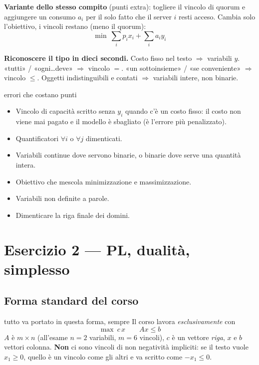 \documentclass[11pt,a4paper]{article}
\begin{document}
\textbf{Variante dello stesso compito} (punti extra): togliere il vincolo di quorum e
aggiungere un consumo $a_i$ per il solo fatto che il server $i$ resti acceso. Cambia solo
l'obiettivo, i vincoli restano (meno il quorum):
\[
\min \ \sum_i p_i x_i + \sum_i a_i y_i
\]

\begin{idea}
\textbf{Riconoscere il tipo in dieci secondi.}
Costo fisso nel testo $\Rightarrow$ variabili $y$. \enspace
«tutti» / «ogni\dots deve» $\Rightarrow$ vincolo $=$. \enspace
«un sottoinsieme» / «se conveniente» $\Rightarrow$ vincolo $\le$. \enspace
Oggetti indistinguibili e contati $\Rightarrow$ variabili intere, non binarie.
\end{idea}

\begin{att}{errori che costano punti}
\begin{itemize}
\item Vincolo di capacità scritto senza $y_i$ quando c'è un costo fisso: il costo non viene mai
      pagato e il modello è sbagliato (è l'errore più penalizzato).
\item Quantificatori $\forall i$ o $\forall j$ dimenticati.
\item Variabili continue dove servono binarie, o binarie dove serve una quantità intera.
\item Obiettivo che mescola minimizzazione e massimizzazione.
\item Variabili non definite a parole.
\item Dimenticare la riga finale dei domini.
\end{itemize}
\end{att}

\newpage
\section{Esercizio 2 --- PL, dualità, simplesso}

\subsection{Forma standard del corso}

\begin{att}{tutto va portato in questa forma, sempre}
Il corso lavora \emph{esclusivamente} con
\[
\boxed{\ \max\ c\,x \qquad A x \le b\ }
\]
$A$ è $m\times n$ (all'esame $n=2$ variabili, $m=6$ vincoli), $c$ è un vettore \emph{riga},
$x$ e $b$ vettori colonna. \textbf{Non} ci sono vincoli di non negatività impliciti:
se il testo vuole $x_1\ge 0$, quello è un vincolo come gli altri e va scritto come $-x_1 \le 0$.
\end{att}
\end{document}

